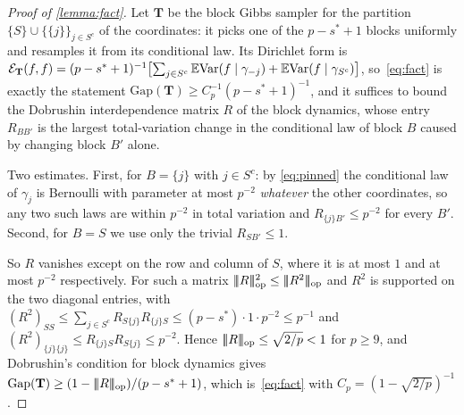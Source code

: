 \begin{proof}[Proof of \cref{lemma:fact}]
    Let $\mathbf{T}$ be the block Gibbs sampler for the partition
    $\{S\}\cup\{\{j\}\}_{j\in S^{c}}$ of the coordinates: it picks one of
    the $p-s^{\ast}+1$ blocks uniformly and resamples it from its
    conditional law. Its Dirichlet form is
    $\mathcal{E}_{\mathbf{T}}(f,f)=(p-s^{\ast}+1)^{-1}\bigl[\sum_{j\in
    S^{c}}\mathbb{E}\mathrm{Var}(f\mid\gamma_{-j})+\mathbb{E}\mathrm{Var}(f\mid
    \gamma_{S^{c}})\bigr]$, so~\eqref{eq:fact} is exactly the statement
    $\mathrm{Gap}(\mathbf{T})\geq C_p^{-1}(p-s^{\ast}+1)^{-1}$, and it
    suffices to bound the Dobrushin interdependence matrix $R$ of the block
    dynamics, whose entry $R_{BB'}$ is the largest total-variation change in
    the conditional law of block $B$ caused by changing block $B'$ alone.

    Two estimates. First, for $B=\{j\}$ with $j\in S^{c}$: by
    \eqref{eq:pinned} the conditional law of $\gamma_j$ is Bernoulli with
    parameter at most $p^{-2}$ \emph{whatever} the other coordinates, so any
    two such laws are within $p^{-2}$ in total variation and
    $R_{\{j\}B'}\leq p^{-2}$ for every $B'$. Second, for $B=S$ we use only
    the trivial $R_{SB'}\leq1$.

    So $R$ vanishes except on the row and column of $S$, where it is at most
    $1$ and at most $p^{-2}$ respectively. For such a matrix
    $\opnorm{R}^{2}\leq\opnorm{R^{2}}$ and $R^{2}$ is supported on the two
    diagonal entries, with $(R^{2})_{SS}\leq\sum_{j\in S^{c}}
    R_{S\{j\}}R_{\{j\}S}\leq(p-s^{\ast})\cdot1\cdot p^{-2}\leq p^{-1}$ and
    $(R^{2})_{\{j\}\{j\}}\leq R_{\{j\}S}R_{S\{j\}}\leq p^{-2}$. Hence
    $|\!|\!|R|\!|\!|_{\mathrm{op}}\leq\sqrt{2/p}<1$ for $p\geq9$, and Dobrushin's condition for
    block dynamics gives
    $\mathrm{Gap}(\mathbf{T})\geq(1-|\!|\!|R|\!|\!|_{\mathrm{op}})/(p-s^{\ast}+1)$, which
    is~\eqref{eq:fact} with $C_p=(1-\sqrt{2/p})^{-1}$.
\end{proof}

